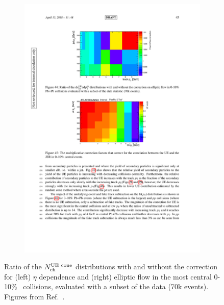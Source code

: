 \begin{figure}
\begin{subfigure}{0.5\textwidth}
\centering \includegraphics[width=1\textwidth]{figures/main/UE/flow_correction.pdf}
\caption{}
\label{fig:flow_corr}
\end{subfigure}
\caption{Ratio of the $\mbox{$N_{\mathrm{ch}}^{\mathrm{UE\ cone}}$}$ distributions with and without the correction for (left) $\eta$ dependence and (right) elliptic flow in the most central 0-10\% \pbpb\ collisions, evaluated with a subset of the data (70k events).
Figures from Ref.~\cite{Sickles:2235420}.}
\label{fig:cone_corrections}
\end{figure}




